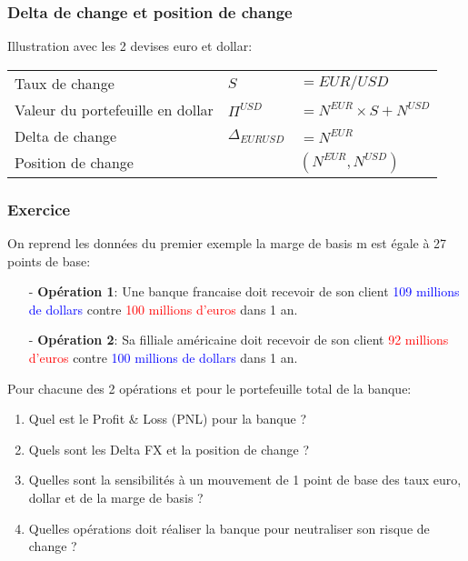 \documentclass{beamer}
\begin{document}
\begin{frame}
\frametitle{Delta de change et position de change}
\small
Illustration avec les 2 devises euro et dollar:\\ 
\vspace{0.5cm}
\begin{tabular}{|l|l l|}
\hline
Taux de change&$S$&$= EUR/USD$\\
Valeur du portefeuille en dollar&$\Pi^{USD}$&$=N^{EUR} \times S + N^{USD}$\\
Delta de change&$\Delta_{EURUSD}$&$=N^{EUR}$\\
Position de change&&$(N^{EUR},N^{USD})$\\
\hline
\end{tabular}
\end{frame}

\begin{frame}
\frametitle{Exercice}
On reprend les données du premier exemple la marge de basis m est égale à 27 points de base:\\
\begin{itemize}
\item[-] \textbf{Opération 1}: Une banque francaise doit recevoir de son client \textcolor{blue}{109 millions de dollars} contre \textcolor{red}{100 millions d'euros} dans 1 an.
\item[-] \textbf{Opération 2}: Sa filliale américaine doit recevoir de son client \textcolor{red}{92 millions d'euros} contre \textcolor{blue}{100 millions de dollars} dans 1 an.
\end{itemize}
Pour chacune des 2 opérations et pour le portefeuille total de la banque:\\
\begin{enumerate}
\item Quel est le Profit \& Loss (PNL) pour la banque ?
\item Quels sont les Delta FX et la position de change ?
\item Quelles sont la sensibilités à un mouvement de 1 point de base des taux euro, dollar et de la marge de basis ?
\item Quelles opérations doit réaliser la banque pour neutraliser son risque de change ?
\end{enumerate}
\end{frame}
\end{document}
